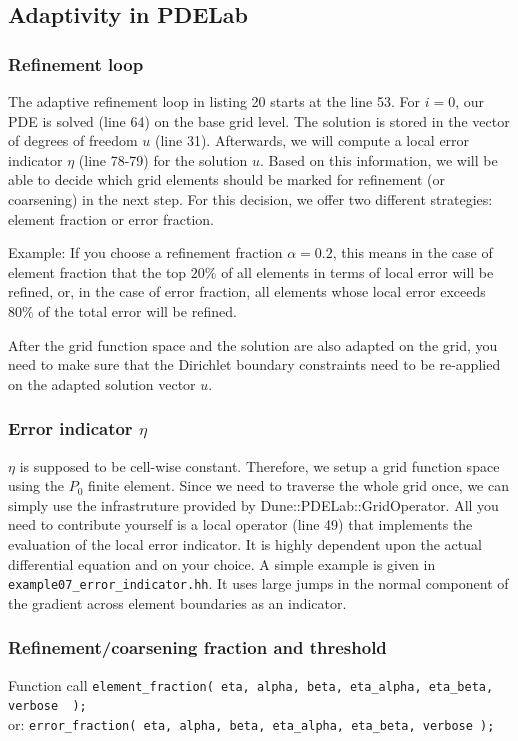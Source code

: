 \subsection{Adaptivity in PDELab}

\subsubsection*{Refinement loop}

The adaptive refinement loop in listing 20 starts at the line 53. For $i=0$, our
PDE is solved (line 64) on the base grid level. The solution is stored in the
vector of degrees of freedom $u$ (line 31). Afterwards, we will compute
a local error indicator $\eta$ (line 78-79) for the solution $u$.
Based on this information, we will be able to decide which grid elements
should be marked for refinement (or coarsening) in the next step.
For this decision, we offer two different strategies: element fraction or error fraction.

Example: If you choose a refinement fraction $\alpha=0.2$, this means in the
case of element fraction that the top $20\%$ of all
elements in terms of local error will be refined, or, in the case of error fraction,
all elements whose local error exceeds $80\%$ of the total error will be refined.

After the grid function space and the solution are also adapted on the grid,
you need to make sure that the Dirichlet boundary constraints need to be
re-applied on the adapted solution vector $u$.


\subsubsection*{Error indicator $\eta$}
$\eta$ is supposed to be cell-wise constant. Therefore, we setup a grid function space using the $P_0$
finite element. Since we need to traverse the whole grid once, we can
simply use the infra\/struture provided by Dune::PDELab::GridOperator.
All you need to contribute yourself is a local operator (line 49) that
implements the evaluation of the local error indicator.
It is highly dependent upon the actual differential equation and on your
choice. A simple example is given in \lstinline{example07_error_indicator.hh}.
It uses large jumps in the normal component of the gradient across element
boundaries as an indicator.



\subsubsection*{Refinement/coarsening fraction and threshold}
\begin{block}{Function call}
  \lstinline{element_fraction( eta, alpha, beta, eta_alpha, eta_beta, verbose  );}\\
  or: \lstinline{error_fraction( eta, alpha, beta, eta_alpha, eta_beta, verbose );}
\end{block}

